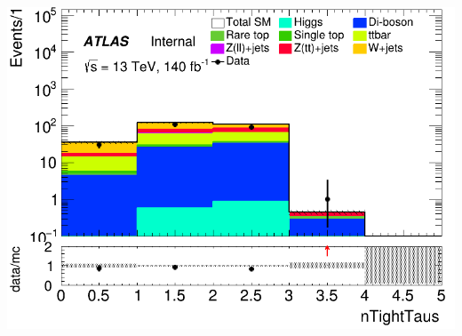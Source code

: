 \documentclass[usenames,dvipsnames]{beamer}
\begin{document}
\begin{frame}
\begin{minipage}{0.32\textwidth}
        \includegraphics[width=\textwidth]{graphics/LHH_met/LHH_met_nTightTaus.png}
    \end{minipage}
\end{frame}
\end{document}
